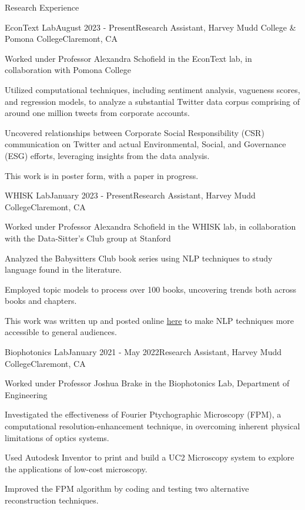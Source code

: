\documentclass[
	11pt, %
]{resume} %
\begin{document}
\begin{rSection}{Research Experience}

	\begin{rSubsection}{EconText Lab}{August 2023 - Present}{Research Assistant, Harvey Mudd College \& Pomona College}{Claremont, CA}
            \item Worked under Professor Alexandra Schofield in the EconText lab, in collaboration with Pomona College
		\item Utilized computational techniques, including sentiment analysis, vagueness scores, and regression models, to analyze a substantial Twitter data corpus comprising of around one million tweets from corporate accounts. 
		\item Uncovered relationships between Corporate Social Responsibility (CSR) communication on Twitter and actual  Environmental, Social, and Governance (ESG) efforts, leveraging insights from the data analysis. 
		\item This work is in poster form, with a paper in progress.
	\end{rSubsection}


	\begin{rSubsection}{WHISK Lab}{January 2023 - Present}{Research Assistant, Harvey Mudd College}{Claremont, CA}
		\item Worked under Professor Alexandra Schofield in the WHISK lab, in collaboration with the Data-Sitter's Club group at Stanford
		\item Analyzed the Babysitters Club book series using NLP techniques to study language found in the literature. 
		\item Employed topic models to process over 100 books, uncovering trends both across books and chapters. 
		\item This work was written up and posted online \href{https://datasittersclub.github.io/site/dsc20.html}{here} to make NLP techniques more accessible to general audiences.
	\end{rSubsection}


	\begin{rSubsection}{Biophotonics Lab}{January 2021 - May 2022}{Research Assistant, Harvey Mudd College}{Claremont, CA}
		\item Worked under Professor Joshua Brake in the Biophotonics Lab, Department of Engineering
		\item Investigated the effectiveness of Fourier Ptychographic Microscopy (FPM), a computational resolution-enhancement technique, in overcoming inherent physical limitations of optics systems. 
		\item Used Autodesk Inventor to print and build a UC2 Microscopy system to explore the applications of low-cost microscopy.
		\item Improved the FPM algorithm by coding and testing two alternative reconstruction techniques.
	\end{rSubsection}

\end{rSection}
\end{document}
